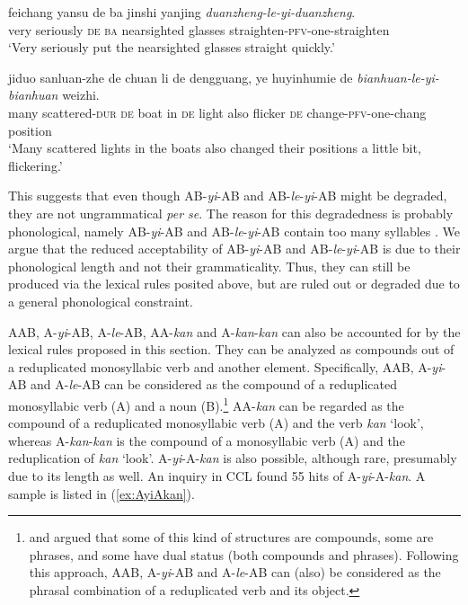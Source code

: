 \documentclass[11pt,a4paper,fleqn,draft]{article}
\let\textbf\emph
\begin{document}
 \ex\label{ex:AByiAB-li}
 \gll feichang yansu de ba jinshi yanjing \textbf{duanzheng-le-yi-duanzheng}.\footnotemark\\
 very seriously \textsc{de} \textsc{ba} nearsighted glasses straighten-\textsc{pfv}-one-straighten\\
 \glt `Very seriously put the nearsighted glasses straight quickly.'
 
 \ex\label{ex:ABleyiAB-ccl}
 \gll jiduo sanluan-zhe de chuan li de dengguang, ye huyinhumie de \textbf{bianhuan-le-yi-bianhuan} weizhi.\\
  many scattered-\textsc{dur} \textsc{de} boat in \textsc{de} light also flicker \textsc{de} change-\textsc{pfv}-one-chang position\\ 
 \glt `Many scattered lights in the boats also changed their positions a little bit, flickering.'
 \z
\z

This suggests that  even though AB-\emph{yi}-AB and AB-\emph{le}-\emph{yi}-AB might be degraded, they are not ungrammatical \emph{per se}.
The reason for this degradedness is probably phonological, namely  AB-\emph{yi}-AB and AB-\emph{le}-\emph{yi}-AB contain too many syllables \citetext{\citealp[274]{Fan1964}, \citealp[143]{Sui2018}, \citealp[239]{YangWei2017}, \citealp[15]{Zhang2000}}.
We argue that  the reduced acceptability of AB-\emph{yi}-AB and AB\hyp{}\emph{le}\hyp{}\emph{yi}\hyp{}AB is due to their phonological length and not their grammaticality.
Thus, they can still be produced via the lexical rules posited above, but are ruled out or degraded due to a general phonological constraint.


AAB, A-\emph{yi}-AB, A-\emph{le}-AB, AA-\emph{kan} and A-\emph{kan}-\emph{kan} can also be accounted for by the lexical rules proposed in this section.
They can be analyzed as compounds out of a reduplicated monosyllabic verb and another element.
Specifically, AAB, A-\emph{yi}-AB and A-\emph{le}-AB can be considered as the compound of a reduplicated monosyllabic verb (A) and a noun (B).\footnote{
\citet{Huang1984} and \citet{Her1996, Her2010} argued that some of this kind of structures are compounds, some are phrases, and some have dual status (both compounds and phrases).
Following this approach, AAB, A-\emph{yi}-AB and A-\emph{le}-AB can (also) be considered as the phrasal combination of a reduplicated verb and its object.
}
AA-\emph{kan} can be regarded as the compound of a reduplicated monosyllabic verb (A) and the verb \emph{kan} `look',
whereas A-\emph{kan}-\emph{kan} is the compound of a monosyllabic verb (A) and the reduplication of \emph{kan} `look'.
A-\emph{yi}-A-\emph{kan} is also possible, although rare, presumably due to its length as well.
An inquiry in CCL found 55 hits of A-\emph{yi}-A-\emph{kan}.
A sample is listed in (\ref{ex:AyiAkan}).
\end{document}
